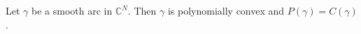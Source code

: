 
Let $\gamma$ be a smooth arc in $\mathbb{C}^N$. Then $\gamma$ is polynomially convex and $P(\gamma) = C(\gamma)$.
